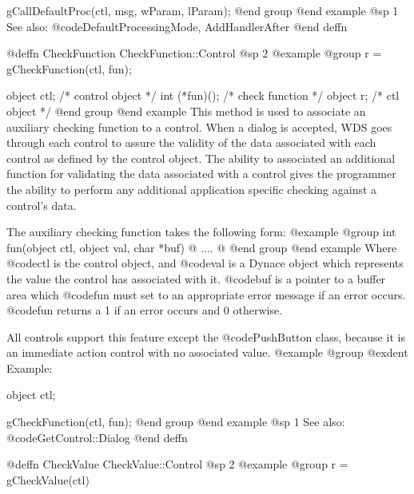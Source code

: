 gCallDefaultProc(ctl, msg, wParam, lParam);
@end group
@end example
@sp 1
See also:  @code{DefaultProcessingMode, AddHandlerAfter}
@end deffn















@deffn {CheckFunction} CheckFunction::Control
@sp 2
@example
@group
r = gCheckFunction(ctl, fun);

object  ctl;      /*  control object  */
int     (*fun)(); /*  check function  */
object  r;        /*  ctl object      */
@end group
@end example
This method is used to associate an auxiliary checking function to a control.
When a dialog is accepted, WDS goes through each control to assure the
validity of the data associated with each control as defined by the control
object.  The ability to associated an additional function for validating
the data associated with a control gives the programmer the ability to perform
any additional application specific checking against a control's data.

The auxiliary checking function takes the following form:
@example
@group
int     fun(object ctl, object val, char *buf)
@{
        ....
@}
@end group
@end example
Where @code{ctl} is the control object, and @code{val} is a Dynace object which
represents the value the control has associated with it.  @code{buf} is a
pointer to a buffer area which @code{fun} must set to an appropriate error
message if an error occurs.  @code{fun} returns a 1 if an error occurs and
0 otherwise.

All controls support this feature except the @code{PushButton} class,
because it is an immediate action control with no associated value.
@example
@group
@exdent Example:

object  ctl;

gCheckFunction(ctl, fun);
@end group
@end example
@sp 1
See also:  @code{GetControl::Dialog}
@end deffn















@deffn {CheckValue} CheckValue::Control
@sp 2
@example
@group
r = gCheckValue(ctl)

